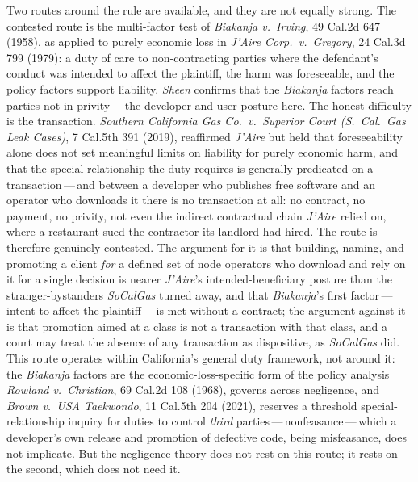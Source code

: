 \documentclass[11pt, twoside, openright]{book}
\begin{document}
Two routes around the rule are available, and they are not equally strong. The contested route is the multi-factor test of \textit{Biakanja v.~Irving}, 49 Cal.2d 647 (1958), as applied to purely economic loss in \textit{J'Aire Corp.~v.~Gregory}, 24 Cal.3d 799 (1979): a duty of care to non-contracting parties where the defendant's conduct was intended to affect the plaintiff, the harm was foreseeable, and the policy factors support liability. \textit{Sheen} confirms that the \textit{Biakanja} factors reach parties not in privity\,---\,the developer-and-user posture here. The honest difficulty is the transaction. \textit{Southern California Gas Co.~v.~Superior Court (S.~Cal.~Gas Leak Cases)}, 7 Cal.5th 391 (2019), reaffirmed \textit{J'Aire} but held that foreseeability alone does not set meaningful limits on liability for purely economic harm, and that the special relationship the duty requires is generally predicated on a transaction\,---\,and between a developer who publishes free software and an operator who downloads it there is no transaction at all: no contract, no payment, no privity, not even the indirect contractual chain \textit{J'Aire} relied on, where a restaurant sued the contractor its landlord had hired. The route is therefore genuinely contested. The argument for it is that building, naming, and promoting a client \textit{for} a defined set of node operators who download and rely on it for a single decision is nearer \textit{J'Aire}'s intended-beneficiary posture than the stranger-bystanders \textit{SoCalGas} turned away, and that \textit{Biakanja}'s first factor\,---\,intent to affect the plaintiff\,---\,is met without a contract; the argument against it is that promotion aimed at a class is not a transaction with that class, and a court may treat the absence of any transaction as dispositive, as \textit{SoCalGas} did. This route operates within California's general duty framework, not around it: the \textit{Biakanja} factors are the economic-loss-specific form of the policy analysis \textit{Rowland v.~Christian}, 69 Cal.2d 108 (1968), governs across negligence, and \textit{Brown v.~USA Taekwondo}, 11 Cal.5th 204 (2021), reserves a threshold special-relationship inquiry for duties to control \textit{third} parties\,---\,nonfeasance\,---\,which a developer's own release and promotion of defective code, being misfeasance, does not implicate. But the negligence theory does not rest on this route; it rests on the second, which does not need it.
\end{document}

